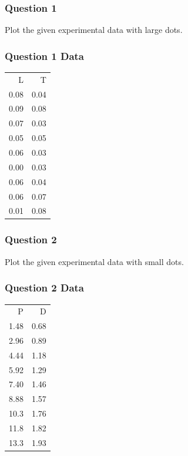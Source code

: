 \documentclass[presentation]{beamer}
\begin{document}
\begin{frame}
\frametitle{Question 1}
\label{sec-4}

  Plot the given experimental data with large dots.
      
  
\end{frame}
\begin{frame}
\frametitle{Question 1 Data}
\label{sec-5}


    
  

\begin{center}
\begin{tabular}{rr}
    L  &     T  \\
 0.08  &  0.04  \\
 0.09  &  0.08  \\
 0.07  &  0.03  \\
 0.05  &  0.05  \\
 0.06  &  0.03  \\
 0.00  &  0.03  \\
 0.06  &  0.04  \\
 0.06  &  0.07  \\
 0.01  &  0.08  \\
\end{tabular}
\end{center}


    
\end{frame}
\begin{frame}
\frametitle{Question 2}
\label{sec-6}

  Plot the given experimental data with small dots.     
\end{frame}
\begin{frame}
\frametitle{Question 2 Data}
\label{sec-7}




\begin{center}
\begin{tabular}{rr}
    P  &     D  \\
 1.48  &  0.68  \\
 2.96  &  0.89  \\
 4.44  &  1.18  \\
 5.92  &  1.29  \\
 7.40  &  1.46  \\
 8.88  &  1.57  \\
 10.3  &  1.76  \\
 11.8  &  1.82  \\
 13.3  &  1.93  \\
\end{tabular}
\end{center}


  
\end{frame}
\end{document}
